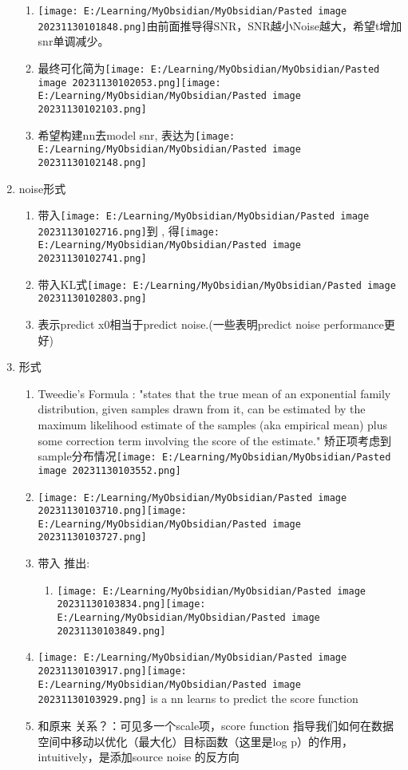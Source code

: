 \documentclass[
]{article}
\providecommand{\tightlist}{%
  \setlength{\itemsep}{0pt}\setlength{\parskip}{0pt}}
\begin{document}
\begin{enumerate}
  \begin{enumerate}
  \tightlist
  \item
    \texttt{[image: E:/Learning/MyObsidian/MyObsidian/Pasted image 20231130101848.png]}由前面推导得SNR，SNR越小Noise越大，希望t增加snr单调减少。
  \item
    最终可化简为\texttt{[image: E:/Learning/MyObsidian/MyObsidian/Pasted image 20231130102053.png]}\texttt{[image: E:/Learning/MyObsidian/MyObsidian/Pasted image 20231130102103.png]}
  \item
    希望构建nn去model snr,
    表达为\texttt{[image: E:/Learning/MyObsidian/MyObsidian/Pasted image 20231130102148.png]}
  \end{enumerate}
\item
  noise形式

  \begin{enumerate}
  \tightlist
  \item
    带入\texttt{[image: E:/Learning/MyObsidian/MyObsidian/Pasted image 20231130102716.png]}到
    {} ,
    得\texttt{[image: E:/Learning/MyObsidian/MyObsidian/Pasted image 20231130102741.png]}
  \item
    带入KL式\texttt{[image: E:/Learning/MyObsidian/MyObsidian/Pasted image 20231130102803.png]}
  \item
    表示predict x0相当于predict noise.(一些表明predict noise
    performance更好)
  \end{enumerate}
\item
  形式

  \begin{enumerate}
  \tightlist
  \item
    Tweedie's Formula : "states that the true mean of an exponential
    family distribution, given samples drawn from it, can be estimated
    by the maximum likelihood estimate of the samples (aka empirical
    mean) plus some correction term involving the score of the
    estimate."
    矫正项考虑到sample分布情况\texttt{[image: E:/Learning/MyObsidian/MyObsidian/Pasted image 20231130103552.png]}
  \item
    \texttt{[image: E:/Learning/MyObsidian/MyObsidian/Pasted image 20231130103710.png]}\texttt{[image: E:/Learning/MyObsidian/MyObsidian/Pasted image 20231130103727.png]}
  \item
    带入{} 推出:

    \begin{enumerate}
    \tightlist
    \item
      \texttt{[image: E:/Learning/MyObsidian/MyObsidian/Pasted image 20231130103834.png]}\texttt{[image: E:/Learning/MyObsidian/MyObsidian/Pasted image 20231130103849.png]}
    \end{enumerate}
  \item
    \texttt{[image: E:/Learning/MyObsidian/MyObsidian/Pasted image 20231130103917.png]}\texttt{[image: E:/Learning/MyObsidian/MyObsidian/Pasted image 20231130103929.png]}{}
    is a nn learns to predict the score function {}
  \item
    和原来{} 关系？：可见多一个scale项，score function
    指导我们如何在数据空间中移动以优化（最大化）目标函数（这里是log
    p）的作用，intuitively，是添加source noise 的反方向


\end{enumerate}
\end{enumerate}
\end{document}
